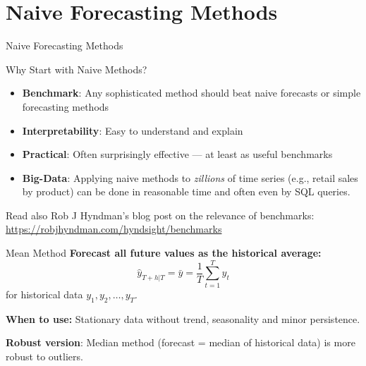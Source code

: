 \documentclass[11pt]{beamer}
\begin{document}

\section{Naive Forecasting Methods}

\begin{frame}
	\begin{center}
		\Large
		Naive Forecasting Methods
	\end{center}
\end{frame}

\begin{frame}{Why Start with Naive Methods?}
	\begin{itemize}
		\setlength{\itemsep}{0.25cm}
		\item \textbf{Benchmark}: Any sophisticated method should beat naive forecasts or simple forecasting methods
		\item \textbf{Interpretability}: Easy to understand and explain
		\item \textbf{Practical}: Often surprisingly effective --- at least as useful benchmarks
		\item \textbf{Big-Data}: Applying naive methods to \textit{zillions} of time series (e.g., retail sales by product) can be done in reasonable time and often even by SQL queries.
	\end{itemize}
	\vspace{1cm}
	Read also Rob J Hyndman's blog post on the relevance of benchmarks: \url{https://robjhyndman.com/hyndsight/benchmarks}
\end{frame}

\begin{frame}{Mean Method}
	\textbf{Forecast all future values as the historical average:}
	\begin{equation}
		\hat{y}_{T+h|T} = \bar{y} = \frac{1}{T}\sum_{t=1}^{T} y_t
	\end{equation}
	for historical data $y_1, y_2, \ldots, y_T$.

	\vspace{0.5cm}
	\textbf{When to use:} Stationary data without trend, seasonality and minor persistence.
	\medskip

	\textbf{Robust version}: Median method (forecast = median of historical data) is more robust to outliers.
\end{frame}
\end{document}
